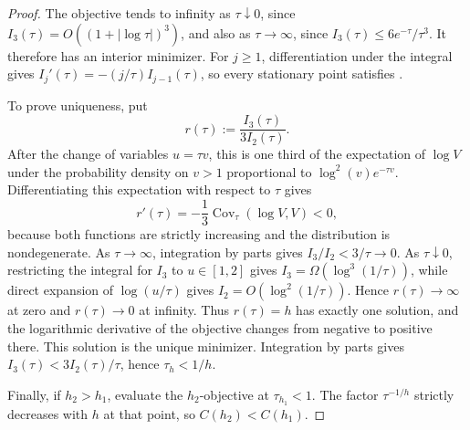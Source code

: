 \documentclass[11pt,letterpaper]{article}
\theoremstyle{definition}
\begin{document}
\begin{proof}
The objective tends to infinity as $\tau\downarrow0$, since
$I_3(\tau)=O((1+|\log\tau|)^3)$, and also as $\tau\to\infty$, since
$I_3(\tau)\le6e^{-\tau}/\tau^3$. It therefore has an interior minimizer.
For $j\geq1$, differentiation under the integral gives
$I_j'(\tau)=-(j/\tau)I_{j-1}(\tau)$, so every stationary point satisfies
.

To prove uniqueness, put
\[
  r(\tau):=\frac{I_3(\tau)}{3I_2(\tau)}.
\]
After the change of variables \(u=\tau v\), this is one third of the
expectation of \(\log V\) under the probability density on \(v>1\)
proportional to \(\log^2(v)e^{-\tau v}\). Differentiating this expectation
with respect to \(\tau\) gives
\[
  r'(\tau)=-\frac13\operatorname{Cov}_\tau(\log V,V)<0,
\]
because both functions are strictly increasing and the distribution is
nondegenerate. As \(\tau\to\infty\), integration by parts gives
\(I_3/I_2<3/\tau\to0\). As \(\tau\downarrow0\), restricting the integral
for \(I_3\) to \(u\in[1,2]\) gives
\(I_3=\Omega(\log^3(1/\tau))\), while direct expansion of
\(\log(u/\tau)\) gives \(I_2=O(\log^2(1/\tau))\). Hence
\(r(\tau)\to\infty\) at zero and \(r(\tau)\to0\) at infinity. Thus
\(r(\tau)=h\) has exactly one solution,
and the logarithmic derivative of the objective changes from negative to
positive there. This solution is the unique minimizer. Integration by
parts gives \(I_3(\tau)<3I_2(\tau)/\tau\), hence
\(\tau_h<1/h\).

Finally, if \(h_2>h_1\), evaluate the \(h_2\)-objective at
\(\tau_{h_1}<1\). The factor \(\tau^{-1/h}\) strictly decreases with \(h\)
at that point, so \(C(h_2)<C(h_1)\).
\end{proof}
\end{document}

